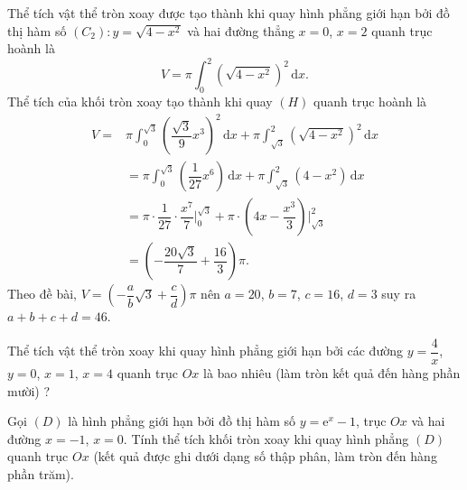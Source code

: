 \begin{ex}
{\begin{itemchoice}
			\itemch Thể tích vật thể tròn xoay được tạo thành khi quay hình phẳng giới hạn bởi đồ thị hàm  số $(C_2) \colon y=\sqrt{4-x^2}$ và hai đường thẳng $x=0$, $x=2$ quanh trục hoành là $$V=\pi\displaystyle\int_{0}^{2} \left(\sqrt{4-x^2}\right)^2\mathrm{\,d}x.$$
			\itemch Thể tích của khối tròn xoay tạo thành khi quay $(H)$ quanh trục  hoành là
			\begin{align*}
				V=&\pi\displaystyle\int_{0}^{\sqrt{3}} \left(\dfrac{\sqrt{3}}{9}x^3\right)^2\mathrm{\,d}x+\pi\displaystyle\int_{\sqrt{3}}^{2} \left(\sqrt{4-x^2}\right)^2\mathrm{\,d}x\\ 
				 &=\pi\displaystyle\int_{0}^{\sqrt{3}} \left(\dfrac{1}{27}x^6\right)\mathrm{\,d}x+\pi\displaystyle\int_{\sqrt{3}}^{2} \left(4-x^2\right)\mathrm{\,d}x\\
				&=\pi \cdot  \dfrac{1}{27} \cdot \dfrac{x^7}{7} \Biggr|_{0}^{\sqrt{3}}+ \pi \cdot \left(4x-\dfrac{x^3}{3}\right)\Biggr|_{\sqrt{3}}^{2}\\
				&=\left(-\dfrac{20 \sqrt{3}}{7}+\dfrac{16}{3}\right)  \pi .
			\end{align*}
			Theo đề bài,  $V=\left(-\dfrac{a}{b}\sqrt{3}+\dfrac{c}{d}\right){\pi}$ nên $a=20$, $b=7$, $c=16$, $d=3$ suy ra $a+b+c+d=46$.
	\end{itemchoice}}
\end{ex}



\begin{bt}%
	Thể tích vật thể tròn xoay khi quay hình phẳng  giới hạn bởi các đường $y=\dfrac{4}{x}$, $y=0$, $x=1$, $x=4$ quanh trục $Ox$ là bao nhiêu (làm tròn kết quả đến hàng phần mười) ?
\end{bt}

\begin{bt}%
	Gọi $(D)$ là hình phẳng giới hạn bởi đồ thị hàm số $y=\mathrm{e}^x-1$, trục $Ox$ và  hai đường $x=-1$, $x=0$. Tính thể tích khối tròn xoay khi quay hình phẳng $(D)$ quanh trục $O x$ (kết quả được ghi dưới dạng số thập phân, làm tròn đến hàng phần trăm).
\end{bt}

